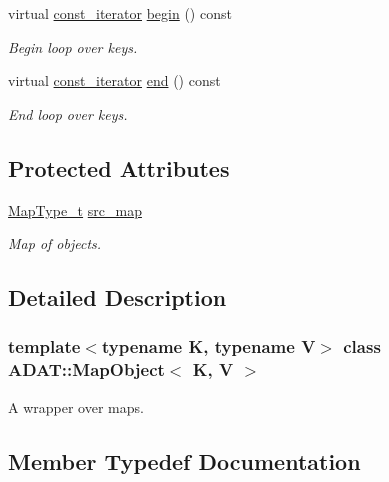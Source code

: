 \begin{DoxyCompactItemize}
virtual \mbox{\hyperlink{classADAT_1_1MapObject_a4622cd7d3b6fed18fe226d28091cc6c8}{const\+\_\+iterator}} \mbox{\hyperlink{classADAT_1_1MapObject_a7f4f6830f0efcc2fcd7bb2aebe0b0c95}{begin}} () const
\begin{DoxyCompactList}\small\item\em Begin loop over keys. \end{DoxyCompactList}\item 
virtual \mbox{\hyperlink{classADAT_1_1MapObject_a4622cd7d3b6fed18fe226d28091cc6c8}{const\+\_\+iterator}} \mbox{\hyperlink{classADAT_1_1MapObject_a1162459ba16798247ab64ee38be25bca}{end}} () const
\begin{DoxyCompactList}\small\item\em End loop over keys. \end{DoxyCompactList}\end{DoxyCompactItemize}
\subsection*{Protected Attributes}
\begin{DoxyCompactItemize}
\item 
\mbox{\hyperlink{classADAT_1_1MapObject_ad6a4952087d3de5a43d08b2ea2ad270b}{Map\+Type\+\_\+t}} \mbox{\hyperlink{classADAT_1_1MapObject_af97a2c41e290158ccab37c2e52383194}{src\+\_\+map}}
\begin{DoxyCompactList}\small\item\em Map of objects. \end{DoxyCompactList}\end{DoxyCompactItemize}


\subsection{Detailed Description}
\subsubsection*{template$<$typename K, typename V$>$\newline
class A\+D\+A\+T\+::\+Map\+Object$<$ K, V $>$}

A wrapper over maps. 

\subsection{Member Typedef Documentation}
\mbox{\label{classADAT_1_1MapObject_a4622cd7d3b6fed18fe226d28091cc6c8}} 
